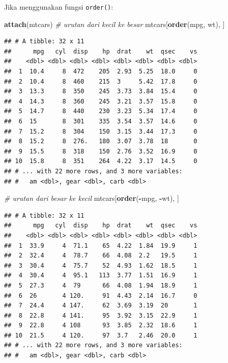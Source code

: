 \documentclass[]{book}
\newenvironment{Shaded}{\begin{snugshade}}{\end{snugshade}}
\newcommand{\KeywordTok}[1]{\textcolor[rgb]{0.13,0.29,0.53}{\textbf{#1}}}
\newcommand{\CommentTok}[1]{\textcolor[rgb]{0.56,0.35,0.01}{\textit{#1}}}
\newcommand{\OperatorTok}[1]{\textcolor[rgb]{0.81,0.36,0.00}{\textbf{#1}}}
\newcommand{\NormalTok}[1]{#1}
\begin{document}
Jika menggunakan fungsi \texttt{order()}:

\begin{Shaded}
\begin{Highlighting}[]
\KeywordTok{attach}\NormalTok{(mtcars)}
\CommentTok{# urutan dari kecil ke besar}
\NormalTok{mtcars[}\KeywordTok{order}\NormalTok{(mpg, wt), ]}
\end{Highlighting}
\end{Shaded}

\begin{verbatim}
## # A tibble: 32 x 11
##      mpg   cyl  disp    hp  drat    wt  qsec    vs
##    <dbl> <dbl> <dbl> <dbl> <dbl> <dbl> <dbl> <dbl>
##  1  10.4     8  472    205  2.93  5.25  18.0     0
##  2  10.4     8  460    215  3     5.42  17.8     0
##  3  13.3     8  350    245  3.73  3.84  15.4     0
##  4  14.3     8  360    245  3.21  3.57  15.8     0
##  5  14.7     8  440    230  3.23  5.34  17.4     0
##  6  15       8  301    335  3.54  3.57  14.6     0
##  7  15.2     8  304    150  3.15  3.44  17.3     0
##  8  15.2     8  276.   180  3.07  3.78  18       0
##  9  15.5     8  318    150  2.76  3.52  16.9     0
## 10  15.8     8  351    264  4.22  3.17  14.5     0
## # ... with 22 more rows, and 3 more variables:
## #   am <dbl>, gear <dbl>, carb <dbl>
\end{verbatim}

\begin{Shaded}
\begin{Highlighting}[]
\CommentTok{# urutan dari besar ke kecil}
\NormalTok{mtcars[}\KeywordTok{order}\NormalTok{(}\OperatorTok{-}\NormalTok{mpg, }\OperatorTok{-}\NormalTok{wt), ]}
\end{Highlighting}
\end{Shaded}

\begin{verbatim}
## # A tibble: 32 x 11
##      mpg   cyl  disp    hp  drat    wt  qsec    vs
##    <dbl> <dbl> <dbl> <dbl> <dbl> <dbl> <dbl> <dbl>
##  1  33.9     4  71.1    65  4.22  1.84  19.9     1
##  2  32.4     4  78.7    66  4.08  2.2   19.5     1
##  3  30.4     4  75.7    52  4.93  1.62  18.5     1
##  4  30.4     4  95.1   113  3.77  1.51  16.9     1
##  5  27.3     4  79      66  4.08  1.94  18.9     1
##  6  26       4 120.     91  4.43  2.14  16.7     0
##  7  24.4     4 147.     62  3.69  3.19  20       1
##  8  22.8     4 141.     95  3.92  3.15  22.9     1
##  9  22.8     4 108      93  3.85  2.32  18.6     1
## 10  21.5     4 120.     97  3.7   2.46  20.0     1
## # ... with 22 more rows, and 3 more variables:
## #   am <dbl>, gear <dbl>, carb <dbl>
\end{verbatim}
\end{document}

